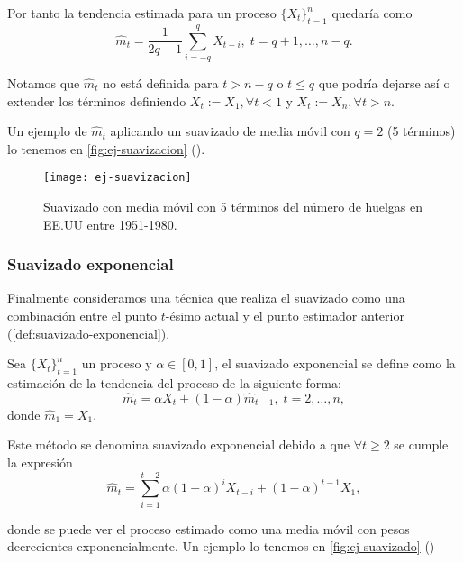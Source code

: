 Por tanto la tendencia estimada para un proceso $\{X_t\}_{t = 1}^n$ quedaría como
\begin{equation*}
  \hat{m}_t = \dfrac{1}{2q + 1} \sum \limits^q_{i = -q} X_{t - i}, \; t = q + 1, \ldots, n - q.
  \label{eq:suavizacion-estimada}
\end{equation*}

Notamos que $\hat{m}_t$ no está definida para $t > n - q$ o $t \leq q$ que podría dejarse así o extender los términos definiendo $X_t := X_1, \forall t < 1$ y $X_t := X_n, \forall t > n$.

Un ejemplo de $\hat{m}_t$ aplicando un suavizado de media móvil con $q = 2$ (5 términos) lo tenemos en \autoref{fig:ej-suavizacion} (\cite{brockwell2002introduction}).

\begin{figure}[htpb]
  \centering
  \texttt{[image: ej-suavizacion]}
  \caption{Suavizado con media móvil con 5 términos del número de huelgas en EE.UU entre 1951-1980.}
  \label{fig:ej-suavizacion}
\end{figure}

\subsubsection{Suavizado exponencial}

Finalmente consideramos una técnica que realiza el suavizado como una combinación entre el punto $t$-ésimo actual y el punto estimador anterior (\autoref{def:suavizado-exponencial}).

\begin{definicion}
  Sea $\{X_t\}_{t = 1}^n$ un proceso y $\alpha \in [0, 1]$, el suavizado exponencial se define como la estimación de la tendencia del proceso de la siguiente forma:
  $$\hat{m}_t = \alpha X_t + (1 - \alpha)\hat{m}_{t - 1}, \; t = 2, \ldots, n,$$
  donde $\hat{m}_1 = X_1$.
  \label{def:suavizado-exponencial}
\end{definicion}

Este método se denomina suavizado exponencial debido a que $\forall t \geq 2$ se cumple la expresión
\begin{equation*}
  \hat{m}_t = \sum \limits^{t - 2}_{i = 1} \alpha(1 - \alpha)^i X_{t - i} + (1 - \alpha)^{t - 1} X_1,
  \label{eq:exponencial-desarrollada}
\end{equation*}

donde se puede ver el proceso estimado como una media móvil con pesos decrecientes exponencialmente. Un ejemplo lo tenemos en \autoref{fig:ej-suavizado} (\cite{brockwell2002introduction})

